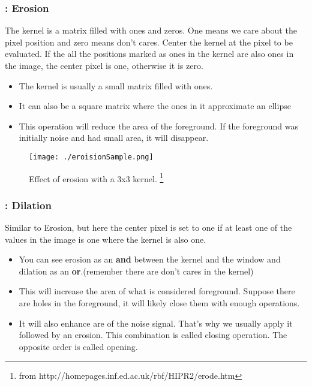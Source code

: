 \documentclass{beamer}
\begin{document}
\begin{frame}
  \frametitle{\subsecname : Erosion}
  \begin{definition}
    The kernel is a matrix filled with ones and zeros. One means we care about the pixel position and zero means don't
    cares. Center the kernel at the pixel to be evaluated. If the all the positions marked as ones in the kernel are
    also ones in the image, the center pixel is one, otherwise it is zero.
  \end{definition}
  \begin{itemize}
      \item The kernel is usually a small matrix filled with ones. 
      \item It can also be a square matrix where the ones in it approximate an ellipse
      \item This operation will reduce the area of the foreground. If the foreground was initially noise and had small
        area, it will disappear.
  \end{itemize}
\end{frame}

\begin{frame}
      \begin{figure}
        \centering
        \texttt{[image: ./eroisionSample.png]}
        \caption{Effect of erosion with a 3x3 kernel. \footnote{from http://homepages.inf.ed.ac.uk/rbf/HIPR2/erode.htm}}
      \end{figure}
\end{frame}


\begin{frame}
  \frametitle{\subsecname : Dilation}
  \begin{definition}
    Similar to Erosion, but here the center pixel is set to one if at least one of the values in the image is one where
    the kernel is also one. 
  \end{definition}

  \begin{itemize}
    \item You can see erosion as an \textbf{and} between the kernel and the window and dilation as an \textbf{or}.(remember there
      are don't cares in the kernel)
    \item This will increase the area of what is considered foreground. Suppose there are holes in the foreground, it
      will likely close them with enough operations. 
    \item It will also enhance are of the noise signal. That's why we usually apply it followed by an erosion. This
      combination is called closing operation. The opposite order is called opening.
  \end{itemize}
\end{frame}
\end{document}
